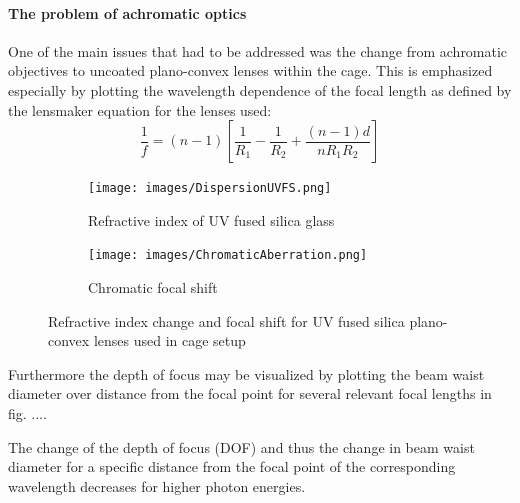 \documentclass[twoside,openright]{scrreprt}
\begin{document}
\paragraph{The problem of achromatic optics}
One of the main issues that had to be addressed was the change from achromatic objectives to uncoated plano-convex lenses within the cage.\newline
This is emphasized especially by plotting the wavelength dependence of the focal length as defined by the lensmaker equation for the lenses used:
\begin{equation}
\frac{1}{f} = (n-1) \left[\frac{1}{R_1} - \frac{1}{R_2} + \frac{(n-1)d}{n R_1 R_2}\right]
\end{equation}
\begin{figure}[h]
\centering

\begin{subfigure}[b]{0.45\textwidth}
\centering
\texttt{[image: images/DispersionUVFS.png]} 
\caption{Refractive index of UV fused silica glass\cite{Malitson:65}}
\end{subfigure}
\hfill
\begin{subfigure}[b]{0.45\textwidth}
\centering
\texttt{[image: images/ChromaticAberration.png]} 
\caption{Chromatic focal shift}
\end{subfigure}

\caption{Refractive index change and focal shift for UV fused silica plano-convex lenses used in cage setup}
\end{figure}

Furthermore the depth of focus may be visualized by plotting the beam waist diameter over distance from the focal point for several relevant focal lengths in fig. ....

The change of the depth of focus (DOF) and thus the change in beam waist diameter for a specific distance from the focal point of the corresponding wavelength decreases for higher photon energies.
\end{document}
